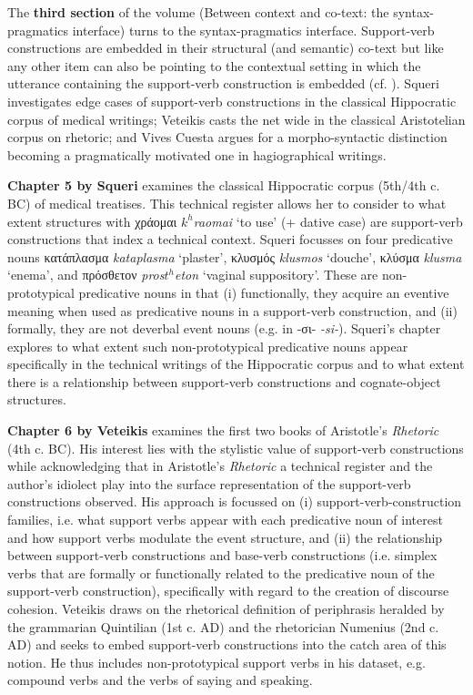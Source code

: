 \documentclass[output=paper,colorlinks,citecolor=brown]{langscibook}
\begin{document}
The \textbf{third section} of the volume (Between context and co-text: the syntax-pragmatics interface) turns to the syntax-pragmatics interface. Support-verb constructions are embedded in their structural (and semantic) co-text \citep[119]{crystalDictionaryLinguisticsPhonetics2008} but like any other item can also be pointing to the contextual setting in which the utterance containing the support-verb construction is embedded (cf. \citealt{benteinDimensionsSocialMeaning2019}).  Squeri investigates edge cases of support-verb constructions in the classical Hippocratic corpus of medical writings; Veteikis casts the net wide in the classical Aristotelian corpus on rhetoric; and Vives Cuesta argues for a morpho-syntactic distinction becoming a pragmatically motivated one in hagiographical writings. 


\textbf{Chapter 5 by Squeri} examines the classical Hippocratic corpus (5th/4th c. BC) of medical treatises. This technical register allows her to consider to what extent structures with χράομαι \textit{$k^{h}$raomai} ‘to use’ (+ dative case) are support-verb constructions that index a technical context. Squeri focusses on four predicative nouns κατάπλασμα \textit{kataplasma} ‘plaster’, κλυσμός \textit{klusmos} ‘douche’, κλύσμα \textit{klusma} ‘enema’, and πρόσθετον \textit{pros$t^{h}$eton} ‘vaginal suppository’. These are non-prototypical predicative nouns in that (i) functionally, they acquire an eventive meaning when used as predicative nouns in a support-verb construction, and (ii) formally, they are not deverbal event nouns (e.g. in -σι- \textit{-si-}). Squeri’s chapter explores to what extent such non-prototypical predicative nouns appear specifically in the technical writings of the Hippocratic corpus and to what extent there is a relationship between support-verb constructions and cognate-object structures. 


\textbf{Chapter 6 by Veteikis} examines the first two books of Aristotle’s \textit{Rhetoric} (4th c. BC). His interest lies with the stylistic value of support-verb constructions while acknowledging that in Aristotle’s \textit{Rhetoric} a technical register and the author’s idiolect play into the surface representation of the support-verb constructions observed. His approach is focussed on (i) support-verb-construction families, i.e. what support verbs appear with each predicative noun of interest and how support verbs modulate the event structure, and (ii) the relationship between support-verb constructions and base-verb constructions (i.e. simplex verbs that are formally or functionally related to the predicative noun of the support-verb construction), specifically with regard to the creation of discourse cohesion. Veteikis draws on the rhetorical definition of periphrasis heralded by the grammarian Quintilian (1st c. AD) and the rhetorician Numenius (2nd c. AD) and seeks to embed support-verb constructions into the catch area of this notion. He thus includes non-prototypical support verbs in his dataset, e.g. compound verbs and the verbs of saying and speaking. 
\end{document}
